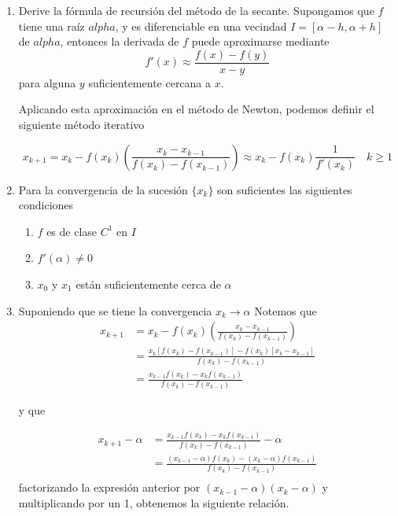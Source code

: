 \vspace{1cm}
\begin{problema} \leavevmode
\begin{enumerate}[label=\alph*)]
    \item Derive la fórmula de recursión del método de la secante.
    Supongamos que \(f\) tiene una raíz \(alpha\), y es diferenciable en una vecindad \(I=[\alpha-h, \alpha+h]\) de \(alpha\), entonces la derivada de \(f\) puede aproximarse mediante \[f'(x)\approx\frac{f(x)-f(y)}{x-y}\] para alguna \(y\) suficientemente cercana a \(x\).

    Aplicando esta aproximación en el método de Newton, podemos definir el siguiente método iterativo

    \[x_{k+1}=x_k-f(x_k)\left(\frac{x_k-x_{k-1}}{f(x_k)-f(x_{k-1})}\right)\approx x_k-f(x_k)\frac{1}{f'(x_k)}\quad k\ge1\]

    \item Para la convergencia de la sucesión \(\{x_k\}\) son suficientes las siguientes condiciones
    \begin{enumerate}[label=\roman*)]
        \item \(f\) es de clase \(C^1\) en \(I\)
        \item \(f'(\alpha)\not=0\)
        \item \(x_0\) y \(x_1\) están suficientemente cerca de \(\alpha\)
    \end{enumerate}

    \item Suponiendo que se tiene la convergencia \(x_k\to\alpha\) Notemos que
    \begin{align*}
        x_{k+1}&=x_k-f(x_k)\left(\frac{x_k-x_{k-1}}{f(x_k)-f(x_{k-1})}\right)\\[1em]
               &=\frac{x_k[f(x_k)-f(x_{k-1})]-f(x_k)[x_k-x_{k-1}]}{f(x_k)-f(x_{k-1})}\\[1em]
               &=\frac{x_{k-1}f(x_k)-x_kf(x_{k-1})}{f(x_k)-f(x_{k-1})}
    \end{align*}

    y que 

    \begin{align*}
        x_{k+1}-\alpha&=\frac{x_{k-1}f(x_k)-x_kf(x_{k-1})}{f(x_k)-f(x_{k-1})}-\alpha\\[1em]
        &=\frac{(x_{k-1}-\alpha)f(x_k)-(x_k-\alpha)f(x_{k-1})}{f(x_k)-f(x_{k-1})}\\[1em]
    \end{align*}
    factorizando la expresión anterior por \((x_{k-1}-\alpha)(x_k-\alpha)\) y multiplicando por un 1, obtenemos la siguiente relación.


\end{enumerate}
\end{problema}
